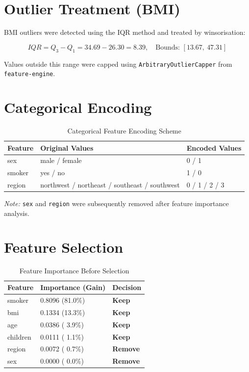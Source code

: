 \documentclass[12pt,a4paper]{report}
\begin{document}
\section{Outlier Treatment (BMI)}

BMI outliers were detected using the IQR method and treated by winsorisation:

\begin{equation}
  IQR = Q_3 - Q_1 = 34.69 - 26.30 = 8.39, \quad
  \text{Bounds: } [13.67,\ 47.31]
\end{equation}

Values outside this range were capped using \texttt{ArbitraryOutlierCapper} from \texttt{feature-engine}.

\section{Categorical Encoding}

\begin{table}[H]
\centering
\caption{Categorical Feature Encoding Scheme}
\begin{tabular}{lll}
\toprule
\textbf{Feature} & \textbf{Original Values} & \textbf{Encoded Values} \\
\midrule
sex    & male / female                                 & 0 / 1 \\
smoker & yes / no                                      & 1 / 0 \\
region & northwest / northeast / southeast / southwest & 0 / 1 / 2 / 3 \\
\bottomrule
\end{tabular}
\end{table}

\textit{Note:} \texttt{sex} and \texttt{region} were subsequently removed after feature importance analysis.

\section{Feature Selection}
\label{sec:feature_selection}

\begin{table}[H]
\centering
\caption{Feature Importance Before Selection}
\begin{tabular}{lll}
\toprule
\textbf{Feature} & \textbf{Importance (Gain)} & \textbf{Decision} \\
\midrule
smoker   & 0.8096 (81.0\%) & \textcolor{successgreen}{\textbf{Keep}} \\
bmi      & 0.1334 (13.3\%) & \textcolor{successgreen}{\textbf{Keep}} \\
age      & 0.0386 ( 3.9\%) & \textcolor{successgreen}{\textbf{Keep}} \\
children & 0.0111 ( 1.1\%) & \textcolor{successgreen}{\textbf{Keep}} \\
region   & 0.0072 ( 0.7\%) & \textcolor{failred}{\textbf{Remove}} \\
sex      & 0.0000 ( 0.0\%) & \textcolor{failred}{\textbf{Remove}} \\
\bottomrule
\end{tabular}
\end{table}
\end{document}
